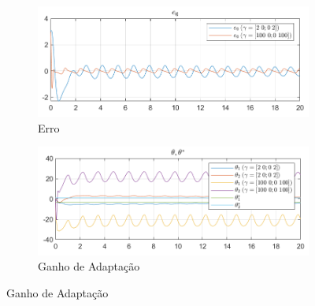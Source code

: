\documentclass[10pt]{article}
\begin{document}
\begin{figure}[h!]
    \centering
    \begin{subfigure}[b]{0.45\textwidth}
        \centering
        \includegraphics[width=\textwidth]{img/fig04a.png}
        \caption{Erro}
    \end{subfigure}
    \begin{subfigure}[b]{0.45\textwidth}
        \centering
        \includegraphics[width=\textwidth]{img/fig04b.png}
        \caption{Ganho de Adaptação}
    \end{subfigure}

    \vspace{0.5cm}


\end{figure}
\end{document}
